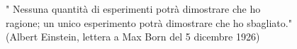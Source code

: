 \documentclass{report}
\begin{document}

\afterpage{\blankpage}



\begin{quoting}
   " Nessuna quantità di esperimenti potrà dimostrare che ho \\ragione; un unico esperimento potrà dimostrare che ho sbagliato."\\
    
    (Albert Einstein, lettera a Max Born del 5 dicembre 1926)
\end{quoting}

\tableofcontents

\clearpage



\newpage 
\ 
\newpage



\afterpage{\blankpage}
\afterpage{\blankpage}



\afterpage{\blankpage}
\end{document}

